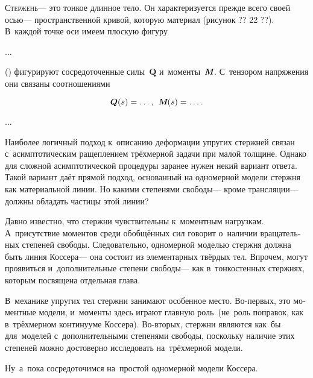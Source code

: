 \begin{otherlanguage}{russian}

\lettrine[lines=2, findent=2pt, nindent=0pt]{С}{тержень}\:--- это тонкое длинное тело. Он характеризуется прежде всего своей осью\:--- пространственной кривой, которую  материал (рисунок ?? 22 ??). В~каждой точке оси имеем плоскую фигуру

...

 () фигурируют сосредоточенные силы~$\bm{Q}$ и~моменты~$\mathboldM$. С~тензором напряжения они связаны соотношениями

\nopagebreak\vspace{-0.2em}\begin{equation}
\bm{Q}(s) = \ldots \hspace{.1ex} ,
\:\:
\mathboldM(s) = \ldots \hspace{.1ex} .
\end{equation}

...


Наиболее логичный подход к~описанию деформации упругих стержней связан с~асимптотическим ращеплением трёхмерной задачи при малой толщине. Однако для сложной асимптотической процедуры заранее нужен некий вариант ответа. Такой вариант даёт прямой подход, основанный на одномерной модели стержня как материальной линии. Но какими степенями свободы\:--- кроме трансляции\:--- должны обладать частицы этой линии?

Давно известно, что стержни чувствительны к~моментным нагрузкам. А~присутствие моментов среди обобщённых сил говорит о~наличии вращательных степеней свободы. Следовательно, одномерной моделью стержня должна быть линия Коссера\:--- она состоит из элементарных твёрдых тел. Впрочем, могут проявиться и~дополнительные степени свободы\:--- как в~тонкостенных стержнях, которым посвящена отдельная глава.

В~механике упругих тел стержни занимают особенное место. Во\hbox{-}первых, это моментные модели, и~моменты здесь играют главную роль~(не~роль поправок, как в~трёхмерном континууме Коссера). Во\hbox{-}вторых, стержни являются как~бы  для~моделей с~дополнительными степенями свободы, поскольку наличие этих степеней можно достоверно исследовать на~трёх\-мерной модели.

Ну~а~пока сосредоточимся на~простой одномерной модели Коссера.



\end{otherlanguage}

